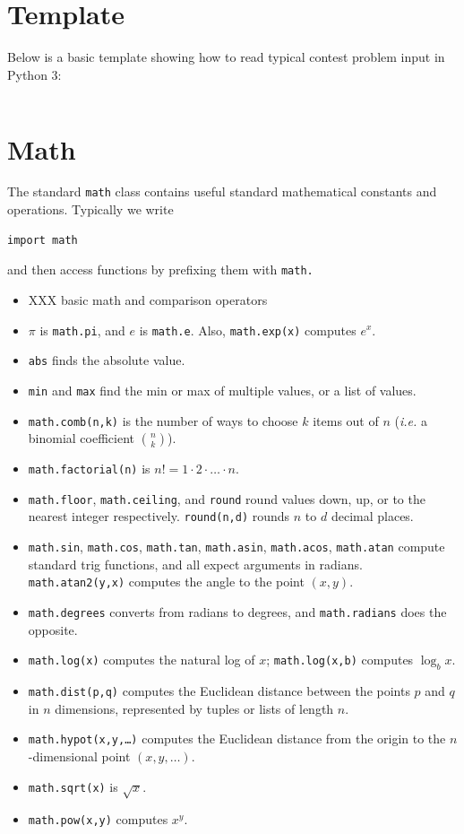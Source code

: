 \documentclass[10pt]{book}
\newcommand{\pycode}[1]{\inputminted[linenos=true,mathescape]{python}{code/#1}}
\newcommand{\py}[1]{\texttt{#1}}
\begin{document}
\section{Template}

Below is a basic template showing how to read typical contest problem
input in Python 3:

\pycode{python/template.py}

\section{Math}

The standard \py{math} class contains useful standard mathematical
constants and operations.  Typically we write
\begin{verbatim}
import math
\end{verbatim}
and then access functions by prefixing them with \py{math.}
\begin{itemize}
\item XXX basic math and comparison operators
\item $\pi$ is \py{math.pi}, and $e$ is \py{math.e}.  Also,
  \py{math.exp(x)} computes $e^x$.
\item \py{abs} finds the absolute value.
\item \py{min} and \py{max} find the min or max of multiple
  values, or a list of values.
\item \py{math.comb(n,k)} is the number of ways to choose $k$
  items out of $n$ (\emph{i.e.} a binomial coefficient $\binom n k$).
\item \py{math.factorial(n)} is $n! = 1 \cdot 2 \cdot \dots \cdot
  n$.
\item \py{math.floor}, \py{math.ceiling}, and
  \py{round} round values down, up, or to the nearest integer
  respectively.  \py{round(n,d)} rounds $n$ to $d$ decimal places.
\item \py{math.sin}, \py{math.cos}, \py{math.tan},
  \py{math.asin}, \py{math.acos}, \py{math.atan} compute
  standard trig functions, and all expect arguments in
  radians. \py{math.atan2(y,x)} computes the angle to the point
  $(x,y)$.
\item \py{math.degrees} converts from radians to degrees, and
  \py{math.radians} does the opposite.
\item \py{math.log(x)} computes the natural log of $x$;
  \py{math.log(x,b)} computes $\log_b x$.
\item \py{math.dist(p,q)} computes the Euclidean distance between
  the points $p$ and $q$ in $n$ dimensions, represented by tuples or
  lists of length $n$.
\item \py{math.hypot(x,y,\dots)} computes the Euclidean distance from
  the origin to the $n$-dimensional point $(x,y,\dots)$.
\item \py{math.sqrt(x)} is $\sqrt{x}$.
\item \py{math.pow(x,y)} computes $x^y$.
\end{itemize}
\end{document}
